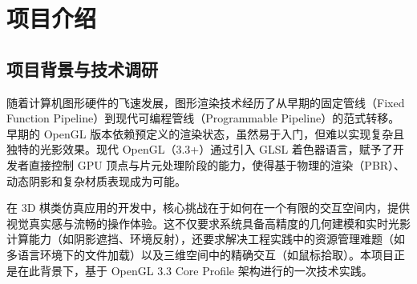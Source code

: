 \documentclass[a4paper]{article}
\begin{document}
\begin{abstract}
本项目基于 OpenGL 3.3 Core Profile 架构，设计并实现了一个高真实感的 3D 中国象棋对弈系统。项目摒弃了传统的固定管线开发模式，完全采用现代可编程管线技术（Programmable Pipeline），在保证实时渲染性能（稳定 60 FPS+）的前提下，集成了多项高级图形学特性。

在视觉表现上，系统实现了基于 Phong 模型的复杂光照计算、两遍法（Two-Pass）阴影映射（Shadow Mapping）以及基于等距柱状投影（Equirectangular Projection）的高动态范围天空盒。在工程实践方面，针对 Windows 环境下 C++ 开发中常见的中文路径资源加载痛点，本项目引入了 Windows Imaging Component (WIC) 替代传统的 \texttt{stb\_image} 库，利用 COM 组件技术彻底解决了多语言环境下的路径编码问题。此外，项目探索了程序化建模（Procedural Modeling）技术，通过三角函数参数方程动态生成具有自然扰动效果的石桌与石凳模型，相比静态网格加载降低了显存占用与磁盘 I/O 开销。

交互方面，系统实现了基于逆矩阵变换的射线投射（Ray Casting）算法，支持精确的 3D 空间拾取与棋子移动。实验结果表明，该系统在视觉保真度、交互流畅性及代码健壮性方面均达到了预期目标，是对计算机图形学理论与工程实践的一次深度整合。

\textbf{关键词：} OpenGL, Shadow Mapping, WIC, Ray Casting, Procedural Modeling, Skybox, GLSL
\end{abstract}
\newpage

\section{项目介绍}

\subsection{项目背景与技术调研}
随着计算机图形硬件的飞速发展，图形渲染技术经历了从早期的固定管线（Fixed Function Pipeline）到现代可编程管线（Programmable Pipeline）的范式转移。早期的 OpenGL 版本依赖预定义的渲染状态，虽然易于入门，但难以实现复杂且独特的光影效果。现代 OpenGL（3.3+）通过引入 GLSL 着色器语言，赋予了开发者直接控制 GPU 顶点与片元处理阶段的能力，使得基于物理的渲染（PBR）、动态阴影和复杂材质表现成为可能。

在 3D 棋类仿真应用的开发中，核心挑战在于如何在一个有限的交互空间内，提供视觉真实感与流畅的操作体验。这不仅要求系统具备高精度的几何建模和实时光影计算能力（如阴影遮挡、环境反射），还要求解决工程实践中的资源管理难题（如多语言环境下的文件加载）以及三维空间中的精确交互（如鼠标拾取）。本项目正是在此背景下，基于 OpenGL 3.3 Core Profile 架构进行的一次技术实践。
\end{document}
